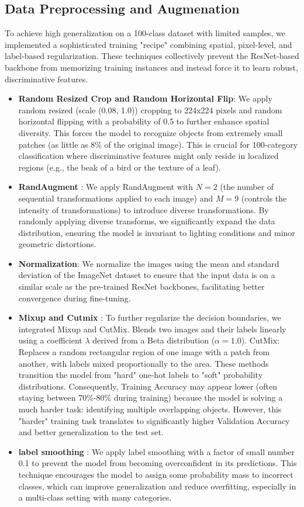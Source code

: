 \documentclass[a4paper, twocolumn]{article} %
\begin{document}
\subsection{Data Preprocessing and Augmenation}
To achieve high generalization on a 100-class dataset with limited samples, we implemented a sophisticated training 
"recipe" combining spatial, pixel-level, and label-based regularization.
These techniques collectively prevent the ResNet-based backbone from memorizing training instances and
instead force it to learn robust, discriminative features.
\begin{itemize}
    \item \textbf{Random Resized Crop and Random Horizontal Flip}: We apply random resized (scale (0.08, 1.0)) cropping to 224x224 pixels and random horizontal flipping with a probability of 0.5 to further enhance spatial diversity. This forces the model to recognize objects from extremely small patches (as little as 8\% of the original image). This is crucial for 100-category classification where discriminative features might only reside in localized regions (e.g., the beak of a bird or the texture of a leaf). 
    \item \textbf{RandAugment} \cite{RandAugment_pulished, RandAugment_pytorch}: We apply RandAugment with $N=2$ (the number of sequential transformations applied to each image) and $M=9$ (controls the intensity of transformations) to introduce diverse transformations. By randomly applying diverse transforms, we significantly expand the data distribution, ensuring the model is invariant to lighting conditions and minor geometric distortions.
    \item \textbf{Normalization}: We normalize the images using the mean and standard deviation of the ImageNet dataset to ensure that the input data is on a similar scale as the pre-trained ResNet backbones, facilitating better convergence during fine-tuning.
    \item \textbf{Mixup and Cutmix} \cite{mixup_pulished, cutmix_pulished, MixUp_CutMix_pytorch}: To further regularize the decision boundaries, we integrated Mixup and CutMix. Blends two images and their labels linearly using a coefficient $\lambda$ derived from a Beta distribution ($\alpha=1.0$). CutMix: Replaces a random rectangular region of one image with a patch from another, with labels mixed proportionally to the area. These methods transition the model from "hard" one-hot labels to "soft" probability distributions. Consequently, Training Accuracy may appear lower (often staying between 70\%-80\% during training) because the model is solving a much harder task: identifying multiple overlapping objects. However, this "harder" training task translates to significantly higher Validation Accuracy and better generalization to the test set.
    \item \textbf{label smoothing} \cite{label_smoothing_pulished}: We apply label smoothing with a factor of small number 0.1 to prevent the model from becoming overconfident in its predictions. This technique encourages the model to assign some probability mass to incorrect classes, which can improve generalization and reduce overfitting, especially in a multi-class setting with many categories.
\end{itemize} 
\end{document}
